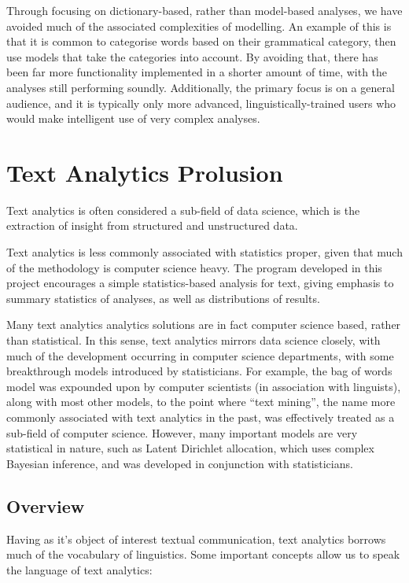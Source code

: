 \documentclass[11pt, a4paper, twoside, titlepage]{report}
\begin{document}
Through focusing on dictionary-based, rather than model-based
analyses, we have avoided much of the associated complexities of
modelling. An example of this is that it is common to categorise words
based on their grammatical category, then use models that take the
categories into account. By avoiding that, there has been far more
functionality implemented in a shorter amount of time, with the
analyses still performing soundly. Additionally, the primary focus is
on a general audience, and it is typically only more advanced,
linguistically-trained users who would make intelligent use of very
complex analyses.

\chapter{Text Analytics Prolusion}\label{cha:text-analyt-backgr}

Text analytics is often considered a sub-field of data science, which
is the extraction of insight from structured and unstructured data\autocite{rajman1998text}.

Text analytics is less commonly associated with statistics proper,
given that much of the methodology is computer science heavy. The
program developed in this project encourages a simple statistics-based
analysis for text, giving emphasis to summary statistics of analyses,
as well as distributions of results.

Many text analytics analytics solutions are in fact computer science
based, rather than statistical. In this sense, text analytics mirrors
data science closely, with much of the development occurring in
computer science departments, with some breakthrough models introduced
by statisticians. For example, the bag of words model was expounded
upon by computer scientists (in association with linguists), along
with most other models, to the point where ``text mining'', the name
more commonly associated with text analytics in the past, was
effectively treated as a sub-field of computer
science\autocite{ko2012study}. However, many important models are very
statistical in nature, such as Latent Dirichlet allocation, which uses
complex Bayesian inference, and was developed in conjunction with
statisticians\autocite{blei2003latent}.

\section{Overview}\label{sec:overview}

Having as it's object of interest textual communication, text
analytics borrows much of the vocabulary of linguistics. Some
important concepts allow us to speak the language of text analytics:
\end{document}
